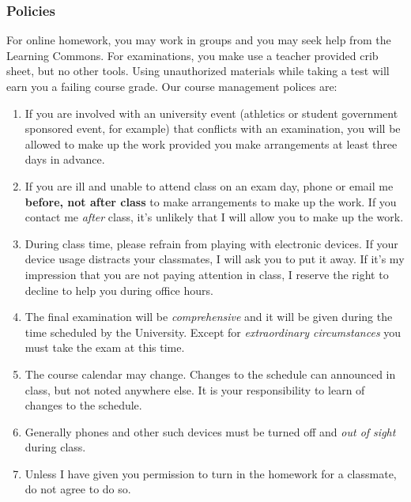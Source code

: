 \documentclass[12pt,fullpage]{article}
\newcounter{ex}\setcounter{ex}{0}
\begin{document}
\subsubsection* {Policies}

For online homework, you may work in groups and you may seek help from the Learning Commons. For examinations, you make use a teacher provided crib sheet, but no other 
tools. Using unauthorized materials while taking a test will earn you a failing course grade.   Our course management polices are:

\begin{enumerate}
      
\item If you are involved with an university event (athletics or student government sponsored event, for example) that
conflicts with an examination, you will be allowed to make up the  work provided you make arrangements at least three days in
advance.
 
\item If you are ill and unable to attend class on an exam day, phone or email me \textbf{before, not after class} to make
arrangements to make up the work. If you contact me \emph{after} class, it's unlikely that I will allow you to make up the work.

\item During class time, please refrain from playing with electronic devices. If your device usage distracts your classmates, I will ask you to put it away. If it's my impression that you are not paying attention in class, I reserve the right to decline to help you during office hours.

\item The final examination will be \emph{comprehensive} and it will be given during the time scheduled by the University. Except for \emph{extraordinary circumstances}
you must take the exam at this time.


\item The course calendar may change. Changes to the schedule can announced in class, but not noted anywhere else. It is your responsibility to
learn of changes to the schedule.
 
\item Generally phones and other such devices must be turned off and \emph{out of sight} during class.

\item Unless I have given you permission to turn in the homework for a classmate, do not agree to do so.


\end{enumerate}
\end{document}
